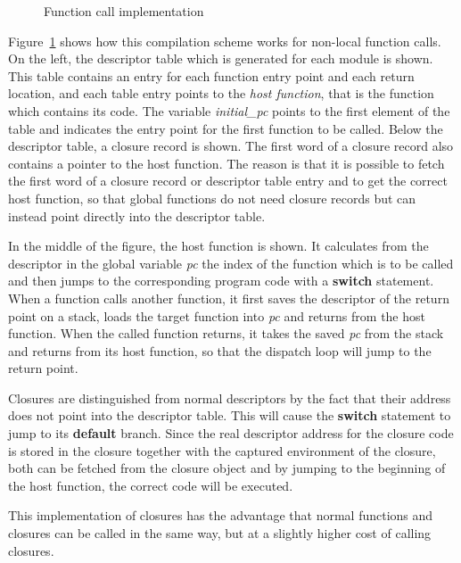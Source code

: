 \begin{figure}[htp]
\begin{center}

\end{center}
\caption{Function call implementation}
\label{pic:dispatcher}
\end{figure}

Figure~\ref{pic:dispatcher} shows how this compilation scheme works
for non-local function calls.  On the left, the descriptor table which
is generated for each module is shown.  This table contains an entry
for each function entry point and each return location, and each table
entry points to the {\em host function}, that is the \cee{} function
which contains its code.  The variable {\em initial\_pc} points to the
first element of the table and indicates the entry point for the first
function to be called.  Below the descriptor table, a closure record
is shown.  The first word of a closure record also contains a pointer
to the host function.  The reason is that it is possible to fetch the
first word of a closure record or descriptor table entry and to get
the correct host function, so that global functions do not need
closure records but can instead point directly into the descriptor
table.

In the middle of the figure, the host function is shown.  It
calculates from the descriptor in the global variable {\em pc} the
index of the function which is to be called and then jumps to the
corresponding program code with a {\bf switch} statement.  When a
function calls another function, it first saves the descriptor of the
return point on a stack, loads the target function into {\em pc} and
returns from the host function.  When the called function returns, it
takes the saved {\em pc} from the stack and returns from its host
function, so that the dispatch loop will jump to the return point.

Closures are distinguished from normal descriptors by the fact that
their address does not point into the descriptor table.  This will
cause the {\bf switch} statement to jump to its {\bf default} branch.
Since the real descriptor address for the closure code is stored in
the closure together with the captured environment of the closure,
both can be fetched from the closure object and by jumping to the
beginning of the host function, the correct code will be executed.

This implementation of closures has the advantage that normal
functions and closures can be called in the same way, but at a
slightly higher cost of calling closures.

